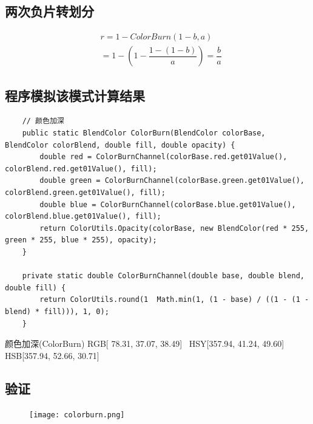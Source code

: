 \subsection{ 两次负片转划分}


\begin{equation}\begin{aligned}&r=1-ColorBurn(1-b,a)\\&=1-(1-\dfrac{1-(1-b)}{a})=\dfrac{b}{a}\end{aligned}\end{equation}

\subsection{ 程序模拟该模式计算结果}
\begin{lstlisting}
	// 颜色加深
	public static BlendColor ColorBurn(BlendColor colorBase, BlendColor colorBlend, double fill, double opacity) {
		double red = ColorBurnChannel(colorBase.red.get01Value(), colorBlend.red.get01Value(), fill);
		double green = ColorBurnChannel(colorBase.green.get01Value(), colorBlend.green.get01Value(), fill);
		double blue = ColorBurnChannel(colorBase.blue.get01Value(), colorBlend.blue.get01Value(), fill);
		return ColorUtils.Opacity(colorBase, new BlendColor(red * 255, green * 255, blue * 255), opacity);
	}
	
	private static double ColorBurnChannel(double base, double blend, double fill) {
		return ColorUtils.round(1  Math.min(1, (1 - base) / ((1 - (1 - blend) * fill))), 1, 0);
	}
\end{lstlisting}

\begin{result}
\item 颜色加深(ColorBurn)     RGB[ 78.31,  37.07,  38.49]~ HSY[357.94,  41.24,  49.60]~ HSB[357.94,  52.66,  30.71]
\end{result}

\subsection{ 验证}
\begin{figure}[!htb]
	\centering
	\texttt{[image: colorburn.png]}
\end{figure}
%
%

